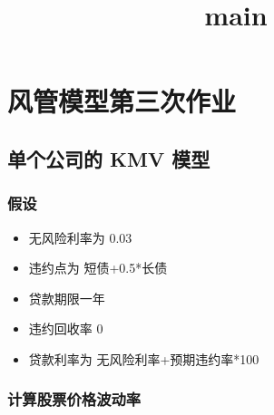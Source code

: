 \documentclass[11pt]{article}
\title{main}
\providecommand{\tightlist}{%
      \setlength{\itemsep}{0pt}\setlength{\parskip}{0pt}}
\begin{document}
    \maketitle




    \hypertarget{ux98ceux7ba1ux6a21ux578bux7b2cux4e09ux6b21ux4f5cux4e1a}{%
\section{风管模型第三次作业}\label{ux98ceux7ba1ux6a21ux578bux7b2cux4e09ux6b21ux4f5cux4e1a}}

    \hypertarget{ux5355ux4e2aux516cux53f8ux7684-kmv-ux6a21ux578b}{%
\subsection{单个公司的 KMV
模型}\label{ux5355ux4e2aux516cux53f8ux7684-kmv-ux6a21ux578b}}

\hypertarget{ux5047ux8bbe}{%
\subsubsection{假设}\label{ux5047ux8bbe}}

\begin{itemize}
\tightlist
\item
  无风险利率为 0.03
\item
  违约点为 短债+0.5*长债
\item
  贷款期限一年
\item
  违约回收率 0
\item
  贷款利率为 无风险利率+预期违约率*100
\end{itemize}

\hypertarget{ux8ba1ux7b97ux80a1ux7968ux4ef7ux683cux6ce2ux52a8ux7387}{%
\subsubsection{计算股票价格波动率}\label{ux8ba1ux7b97ux80a1ux7968ux4ef7ux683cux6ce2ux52a8ux7387}}
\end{document}
